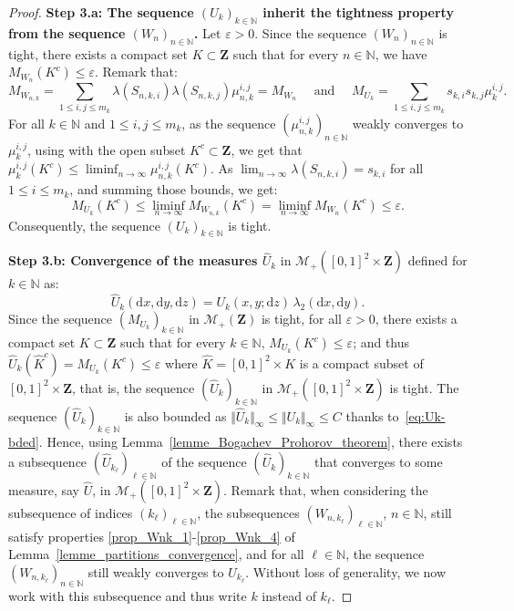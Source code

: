 \documentclass{amsart}
\theoremstyle{plain}
\theoremstyle{definition}
\newcommand{\Space}{\mathbf{Z}}
\newcommand{\Meas}{\mathcal{M}_+(\Space)}
\newcommand{\TotalMass}[1]{\norm{#1}_\infty}
\newcommand{\TM}[1]{\norm{#1}_\infty}
\newcommand{\N}{\mathbb{N}}
\newcommand{\drv}{\mathrm{d}}
\newcommand{\norm}[1]{\Vert#1\Vert}
\newcommand{\eps}{\varepsilon}
\begin{document}
\begin{proof}
\textbf{Step 3.a: The sequence $(U_k )_{k\in\N}$ 
inherit the tightness property from the sequence $(W_n )_{n\in\N}$.}
Let $\eps > 0$. Since the sequence  $(W_n )_{n\in\N}$ is tight,
there exists  a compact set $K\subset \Space$ such that for every $n\in\N$, 
we have $M_{W_n}(K^c) \leq  \eps$. 
Remark that:
\begin{equation*}
M_{W_{n,k}} = \sum_{1\leq i,j \leq m_k} 
		{\lambda(S_{n,k,i})\lambda(S_{n,k,j})}	 \mu_{n,k}^{i,j} 
	= M_{W_n}
	\quad \text{ and }\quad 
M_{U_{k}} = \sum_{1\leq i,j \leq m_k} 
		{s_{k,i}s_{k,j}}	 \mu_{k}^{i,j}  .
\end{equation*}
For all $k\in\N$ and $1\leq i,j \leq m_k$, 
as the sequence $(\mu_{n,k}^{i,j})_{n\in\N}$ weakly converges to $\mu_{k}^{i,j}$,
using \cite[Theorem 2.7.4]{Bogachev} with the open subset $K^c \subset \Space$,
we get that
$  \mu_{k}^{i,j}  (K^c) \leq
	\liminf_{n\rightarrow \infty }	 \mu_{n,k}^{i,j}  (K^c)$.
As $\lim_{n\to\infty} \lambda(S_{n,k,i}) = s_{k,i}$ for all $1\leq i\leq m_k$,
and summing those bounds, we get:
\[
  M_{U_k}(K^c) \leq \liminf_{n\rightarrow \infty } M_{W_{n,k}}(K^c) 
  = \liminf_{n\rightarrow \infty } M_{W_{n}}(K^c) 
  \leq \eps.
\]
Consequently, the sequence $(U_k )_{k\in\N}$ is  tight.

\medskip


\textbf{Step 3.b: Convergence of the  measures 
$\hat U_k $} in $\mathcal{M}_{+}([0,1]^2\times \Space)$ defined for $k\in \N$
as:
\begin{equation}
   \label{eq:def-hat-U}
\hat   U_k(\drv x,\drv y, \drv z) = U_k(x,y;\drv z)\, \lambda_2(\drv x, \drv y).
\end{equation}
Since  the sequence  $(M_{U_k})_{k\in  \N}$   in  $\Meas$ is  tight,   for  all
$\varepsilon>0$, there exists a compact  set $K\subset \Space$ such that
for every $k\in\N$, $M_{U_k}(K^c)         \leq         \varepsilon$;        and         thus
$ \hat U_k (\hat K^c) = M_{U_k}(K^c) \leq \varepsilon$ where $\hat K=[0, 1]^2 \times K$ is
a   compact subset  of   $[0,1]^2\times   \Space$,  that   is,   the   sequence
$(\hat      U_k  )_{k\in       \N}$   in
$\mathcal{M}_{+}([0,1]^2\times \Space)$   is      tight.  
The   sequence $(\hat U_k)_{k\in\N}$ is  also  bounded as
$\TotalMass{\hat      U_k}\leq     \TM{U_k}      \leq     C$      thanks
to~\eqref{eq:Uk-bded}.    Hence, using Lemma~\ref{lemme_Bogachev_Prohorov_theorem},
  there   exists   a   subsequence $(\hat  U_{k_\ell} )_{\ell\in\N}$  of the sequence
$(\hat U_k )_{k\in\N}$ that converges to some  measure, say
$\hat U$, in $\mathcal{M}_{+}([0,1]^2\times  \Space)$.  
Remark that, when considering the   subsequence  of   indices  $(k_\ell)_{\ell\in\N}$,  
the   subsequences
$(W_{n,k_\ell})_{\ell\in\N}$, $n\in\N$,   still   satisfy   properties
\ref{prop_Wnk_1}-\ref{prop_Wnk_4} of
Lemma~\ref{lemme_partitions_convergence},
and  for    all     $\ell\in\N$,
the sequence
$(W_{n,k_\ell})_{n\in\N}$ still weakly converges to $U_{k_\ell}$. 
Without loss  of generality, we now work with this subsequence 
and thus write $k$ instead of $k_\ell$.



\end{proof}
\end{document}
